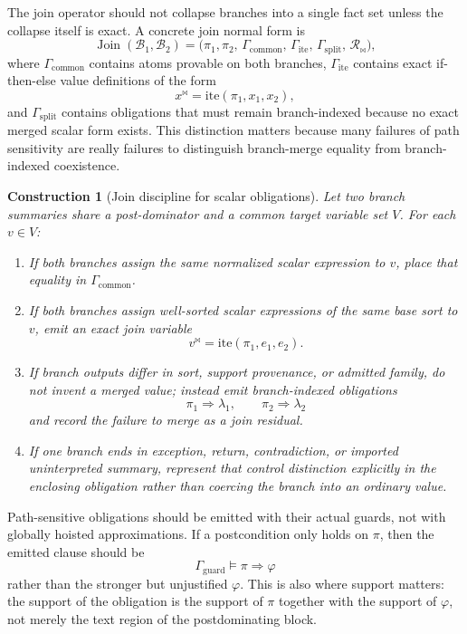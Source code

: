 \documentclass[11pt]{report}
\newtheorem{construction}[definition]{Construction}
\begin{document}
The join operator should not collapse branches into a single fact set unless the collapse itself is exact. A concrete join normal form is
\[
\operatorname{Join}(\mathcal{B}_1,\mathcal{B}_2)
=
\bigl(
\pi_1,\pi_2,\,
\Gamma_{\mathrm{common}},\,
\Gamma_{\mathrm{ite}},\,
\Gamma_{\mathrm{split}},\,
\mathcal{R}_{\Join}
\bigr),
\]
where $\Gamma_{\mathrm{common}}$ contains atoms provable on both branches, $\Gamma_{\mathrm{ite}}$ contains exact if-then-else value definitions of the form
\[
x^{\Join} = \mathrm{ite}(\pi_1, x_1, x_2),
\]
and $\Gamma_{\mathrm{split}}$ contains obligations that must remain branch-indexed because no exact merged scalar form exists. This distinction matters because many failures of path sensitivity are really failures to distinguish branch-merge equality from branch-indexed coexistence.

\begin{construction}[Join discipline for scalar obligations]
Let two branch summaries share a post-dominator and a common target variable set $V$. For each $v \in V$:
\begin{enumerate}
\item If both branches assign the same normalized scalar expression to $v$, place that equality in $\Gamma_{\mathrm{common}}$.
\item If both branches assign well-sorted scalar expressions of the same base sort to $v$, emit an exact join variable
\[
v^{\Join} = \mathrm{ite}(\pi_1, e_1, e_2).
\]
\item If branch outputs differ in sort, support provenance, or admitted family, do not invent a merged value; instead emit branch-indexed obligations
\[
\pi_1 \Rightarrow \lambda_1,
\qquad
\pi_2 \Rightarrow \lambda_2
\]
and record the failure to merge as a join residual.
\item If one branch ends in exception, return, contradiction, or imported uninterpreted summary, represent that control distinction explicitly in the enclosing obligation rather than coercing the branch into an ordinary value.
\end{enumerate}
\end{construction}

Path-sensitive obligations should be emitted with their actual guards, not with globally hoisted approximations. If a postcondition only holds on $\pi$, then the emitted clause should be
\[
\Gamma_{\mathrm{guard}} \models \pi \Rightarrow \varphi
\]
rather than the stronger but unjustified $\varphi$. This is also where support matters: the support of the obligation is the support of $\pi$ together with the support of $\varphi$, not merely the text region of the postdominating block.
\end{document}
